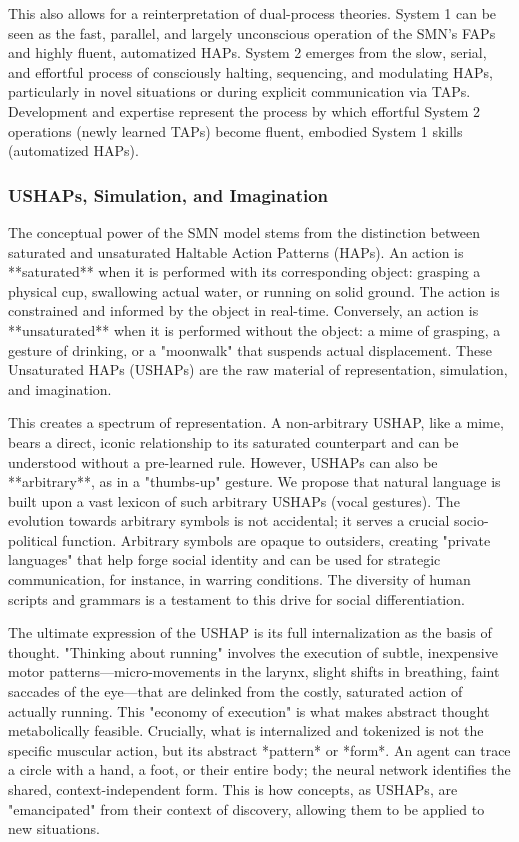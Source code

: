 This also allows for a reinterpretation of dual-process theories. System 1 can be seen as the fast, parallel, and largely unconscious operation of the SMN's FAPs and highly fluent, automatized HAPs. System 2 emerges from the slow, serial, and effortful process of consciously halting, sequencing, and modulating HAPs, particularly in novel situations or during explicit communication via TAPs. Development and expertise represent the process by which effortful System 2 operations (newly learned TAPs) become fluent, embodied System 1 skills (automatized HAPs).

\subsubsection*{USHAPs, Simulation, and Imagination}
The conceptual power of the SMN model stems from the distinction between saturated and unsaturated Haltable Action Patterns (HAPs). An action is **saturated** when it is performed with its corresponding object: grasping a physical cup, swallowing actual water, or running on solid ground. The action is constrained and informed by the object in real-time. Conversely, an action is **unsaturated** when it is performed without the object: a mime of grasping, a gesture of drinking, or a "moonwalk" that suspends actual displacement. These Unsaturated HAPs (USHAPs) are the raw material of representation, simulation, and imagination.

This creates a spectrum of representation. A non-arbitrary USHAP, like a mime, bears a direct, iconic relationship to its saturated counterpart and can be understood without a pre-learned rule. However, USHAPs can also be **arbitrary**, as in a "thumbs-up" gesture. We propose that natural language is built upon a vast lexicon of such arbitrary USHAPs (vocal gestures). The evolution towards arbitrary symbols is not accidental; it serves a crucial socio-political function. Arbitrary symbols are opaque to outsiders, creating "private languages" that help forge social identity and can be used for strategic communication, for instance, in warring conditions. The diversity of human scripts and grammars is a testament to this drive for social differentiation.

The ultimate expression of the USHAP is its full internalization as the basis of thought. "Thinking about running" involves the execution of subtle, inexpensive motor patterns—micro-movements in the larynx, slight shifts in breathing, faint saccades of the eye—that are delinked from the costly, saturated action of actually running. This "economy of execution" is what makes abstract thought metabolically feasible. Crucially, what is internalized and tokenized is not the specific muscular action, but its abstract *pattern* or *form*. An agent can trace a circle with a hand, a foot, or their entire body; the neural network identifies the shared, context-independent form. This is how concepts, as USHAPs, are "emancipated" from their context of discovery, allowing them to be applied to new situations.

